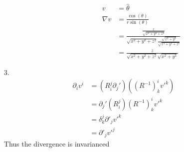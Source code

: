 \documentclass{article}
\begin{document}
\begin{itemize}
\begin{itemize}
\begin{itemize}
\begin{itemize}
\begin{align*}
                    v &= \hat \theta\\
                    \nabla v &= \frac{\cos(\theta)}{r\sin(\theta)}\\
                    &=\frac{\frac{z}{\sqrt{x^2+y^2+z^2}}}{\sqrt{x^2+y^2+z^2}\frac{\sqrt{x^2+y^2}}{\sqrt{x^2+y^2+z^2}}}\\
                    &=\frac{z}{\sqrt{x^2+y^2+z^2}\sqrt{x^2+y^2}}
                \end{align*}
            \end{itemize}
        \end{itemize}
    \end{itemize}
    \newpage
    \item [3.]
    \begin{align*}
        \partial_iv^i &=(R^j_i \partial_j')((R^{-1})^i_kv'^k)\\
        &=\partial_j'(R^j_i )(R^{-1})^i_kv'^k\\
        &=\delta^j_k\partial'_jv'^k\\
        &=\partial'_jv'^j
    \end{align*}
    Thus the divergence is invarianced
\end{itemize}
\end{document}
